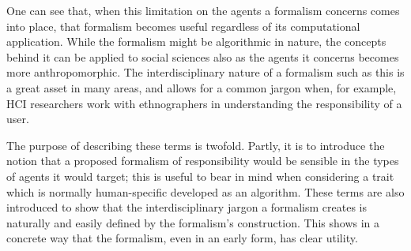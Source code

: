 One can see that, when this limitation on the agents a formalism concerns comes into place, that formalism becomes useful regardless of its computational application. While the formalism might be algorithmic in nature, the concepts behind it can be applied to social sciences also as the agents it concerns becomes more anthropomorphic. The interdisciplinary nature of a formalism such as this is a great asset in many areas, and allows for a common jargon when, for example, HCI researchers work with ethnographers in understanding the responsibility of a user.\par

The purpose of describing these terms is twofold. Partly, it is to introduce the notion that a proposed formalism of responsibility would be sensible in the types of agents it would target; this is useful to bear in mind when considering a trait which is normally human-specific developed as an algorithm. These terms are also introduced to show that the interdisciplinary jargon a formalism creates is naturally and easily defined by the formalism's construction. This shows in a concrete way that the formalism, even in an early form, has clear utility.\par

